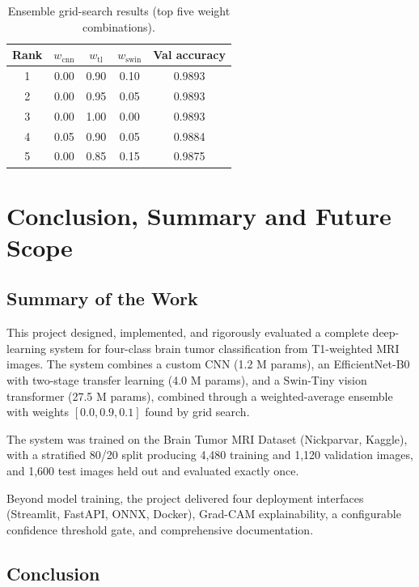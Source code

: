 \documentclass[12pt,a4paper,oneside]{report}
\begin{document}
\begin{table}[H]
  \centering
  \caption{Ensemble grid-search results (top five weight combinations).}
  \label{tab:grid}
  \begin{tabular}{ccccc}
    \toprule
    \textbf{Rank} & \textbf{$w_{\text{cnn}}$} & \textbf{$w_{\text{tl}}$} & \textbf{$w_{\text{swin}}$} & \textbf{Val accuracy} \\
    \midrule
    1 & 0.00 & 0.90 & 0.10 & 0.9893 \\
    2 & 0.00 & 0.95 & 0.05 & 0.9893 \\
    3 & 0.00 & 1.00 & 0.00 & 0.9893 \\
    4 & 0.05 & 0.90 & 0.05 & 0.9884 \\
    5 & 0.00 & 0.85 & 0.15 & 0.9875 \\
    \bottomrule
  \end{tabular}
\end{table}

\chapter{Conclusion, Summary and Future Scope}

\section{Summary of the Work}

This project designed, implemented, and rigorously evaluated a complete deep-learning system for four-class brain tumor classification from T1-weighted MRI images. The system combines a custom CNN (1.2 M params), an EfficientNet-B0 with two-stage transfer learning (4.0 M params), and a Swin-Tiny vision transformer (27.5 M params), combined through a weighted-average ensemble with weights $[0.0, 0.9, 0.1]$ found by grid search.

The system was trained on the Brain Tumor MRI Dataset (Nickparvar, Kaggle), with a stratified 80/20 split producing 4,480 training and 1,120 validation images, and 1,600 test images held out and evaluated exactly once.

Beyond model training, the project delivered four deployment interfaces (Streamlit, FastAPI, ONNX, Docker), Grad-CAM explainability, a configurable confidence threshold gate, and comprehensive documentation.

\section{Conclusion}
\end{document}
